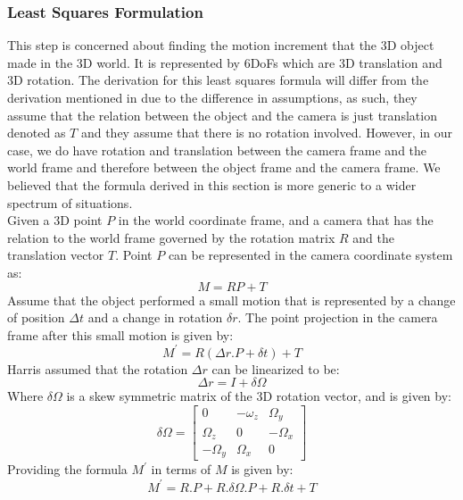 \documentclass{article}
\begin{document}
\subsubsection{Least Squares Formulation}
This step is concerned about finding the motion increment that the 3D object made in the 3D world. It is represented by 6DoFs which are 3D translation and 3D rotation. The derivation for this least squares formula will differ from the derivation mentioned in \cite{harris1990rapid} \cite{lepetit2005monocular} due to the difference in assumptions, as such, they assume that the relation between the object and the camera is just translation denoted as $T$ and they assume that there is no rotation involved. However, in our case, we do have rotation and translation between the camera frame and the world frame and therefore between the object frame and the camera frame. We believed that the formula derived in this section is more generic to a wider spectrum of situations. \\
Given a 3D point $P$ in the world coordinate frame, and a camera that has the relation to the world frame governed by the rotation matrix $R$ and the translation vector $T$. Point $P$ can be represented in the camera coordinate system as:
\begin{equation}
M = RP+T
\end{equation}
Assume that the object performed a small motion that is represented by a change of position $\Delta t$ and a change in rotation $\delta r$. The point projection in the camera frame after this small motion is given by:
\begin{equation}
M^{'} = R(\Delta r.P+\delta t )+ T
\end{equation}
Harris\cite{harris1990rapid} assumed that the rotation $\Delta r$ can be linearized to be:
\begin{equation}
\Delta r = I+\delta \Omega
\end{equation}
Where $\delta \Omega$ is a skew symmetric matrix of the 3D rotation vector, and is given by:
\begin{equation}
\delta \Omega = \begin{bmatrix}
0 & -\omega_z & \Omega_y \\
\Omega_z & 0 & -\Omega_x \\
-\Omega_y & \Omega_x & 0
\end{bmatrix}
\end{equation}
Providing the formula $M^{'}$ in terms of $M$ is given by:
\begin{equation}
M^{'} = R.P + R. \delta\Omega.P+R.\delta t + T
\end{equation}
\end{document}
